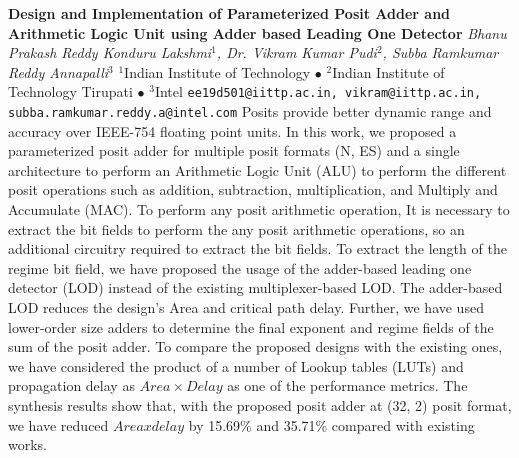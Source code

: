 
    \begin{conf-abstract}[]
        {\textbf{Design and Implementation of Parameterized Posit Adder and Arithmetic Logic Unit using Adder based Leading One Detector}}
        {\textit{Bhanu Prakash Reddy Konduru Lakshmi$^{1}$, Dr. Vikram  Kumar  Pudi$^{2}$, Subba Ramkumar Reddy Annapalli$^{3}$}}
        {$^{1}$Indian Institute of Technology $\bullet$ $^{2}$Indian Institute of Technology Tirupati $\bullet$ $^{3}$Intel}
        {\texttt{ee19d501@iittp.ac.in, vikram@iittp.ac.in, subba.ramkumar.reddy.a@intel.com}}
        {Posits provide better dynamic range and accuracy over IEEE-754 floating point units. In this work, we proposed a parameterized posit adder for multiple posit formats (N, ES) and a single architecture to perform an Arithmetic Logic Unit (ALU) to perform the different posit operations such as addition, subtraction, multiplication, and Multiply and Accumulate (MAC). To perform any posit arithmetic operation, It is necessary to extract the bit fields to perform the any posit arithmetic operations, so an additional circuitry required to extract the bit fields. To extract the length of the regime bit field, we have proposed the usage of the adder-based leading one detector (LOD) instead of the existing multiplexer-based LOD. The adder-based LOD reduces the design's Area and critical path delay. Further, we have used lower-order size adders to determine the final exponent and regime fields of the sum of the posit adder. To compare the proposed designs with the existing ones, we have considered the product of a number of Lookup tables (LUTs) and propagation delay as $Area\times Delay$ as one of the performance metrics. The synthesis results show that, with the proposed posit adder at (32, 2) posit format, we have reduced $Area x delay$ by 15.69\% and 35.71\% compared with existing works.}
    \end{conf-abstract}
        